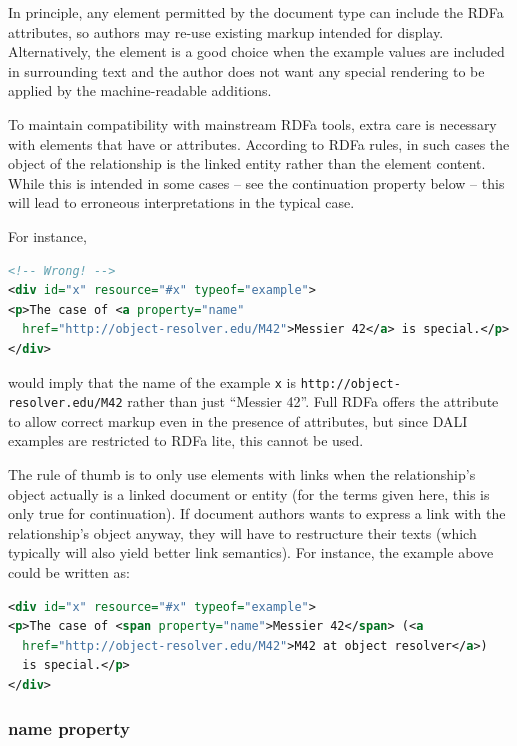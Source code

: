 \documentclass[11pt,letter]{ivoa}
\begin{document}
In principle, any element permitted by the document type can include the RDFa 
attributes, so authors may re-use existing markup intended for display. 
Alternatively, the  element is a good choice when the example values are 
included in surrounding text and the author does not want any special rendering 
to be applied by the machine-readable additions.

To maintain compatibility with mainstream RDFa tools, extra care is
necessary with elements that have  or 
attributes.  According to RDFa rules, in such cases the object of the
relationship is the linked entity rather than the element content.
While this is intended in some cases -- see the continuation property
below -- this will lead to erroneous interpretations in the typical
case.

For instance,

\begin{lstlisting}[language=XML]
<!-- Wrong! -->
<div id="x" resource="#x" typeof="example">
<p>The case of <a property="name" 
  href="http://object-resolver.edu/M42">Messier 42</a> is special.</p>
</div>
\end{lstlisting}

would imply that the name of the example \texttt{x} is
\nolinkurl{http://object-resolver.edu/M42} rather than just ``Messier
42''.  Full RDFa offers the  attribute to allow correct
markup even in the presence of  attributes, but since DALI
examples are restricted to RDFa lite, this cannot be used.

The rule of thumb is to only use elements with links when the
relationship's object actually is a linked document or entity (for the
terms given here, this is only true for continuation).  If document
authors wants to express a link with the relationship's object anyway,
they will have to restructure their texts (which typically will also
yield better link semantics).  For instance, the example above could be
written as:

\begin{lstlisting}[language=XML]
<div id="x" resource="#x" typeof="example">
<p>The case of <span property="name">Messier 42</span> (<a
  href="http://object-resolver.edu/M42">M42 at object resolver</a>)
  is special.</p>
</div>
\end{lstlisting}

\subsubsection{name property}
\end{document}
